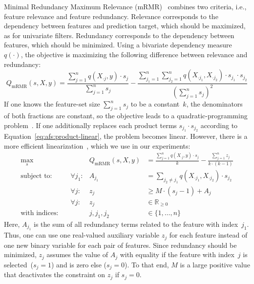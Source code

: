 \documentclass{article}
\theoremstyle{definition}
\begin{document}
Minimal Redundancy Maximum Relevance (mRMR)~\cite{peng2005feature} combines two criteria, i.e., feature relevance and feature redundancy.
Relevance corresponds to the dependency between features and prediction target, which should be maximized, as for univariate filters.
Redundancy corresponds to the dependency between features, which should be minimized.
Using a bivariate dependency measure~$q(\cdot)$, the objective is maximizing the following difference between relevance and redundancy:
%
\begin{equation}
	Q_{\text{mRMR}}(s,X,y) = \frac{\sum_{j=1}^{n} q(X_{\cdot{}j},y) \cdot s_j}{\sum_{j=1}^{n} s_j} - \frac{\sum_{j_1=1}^{n} \sum_{j_2=1}^{n} q(X_{\cdot{}j_1}, X_{\cdot{}j_2}) \cdot s_{j_1} \cdot s_{j_2}}{(\sum_{j=1}^{n} s_j)^2}
	\label{eq:afs:mrmr}
\end{equation}
%
If one knows the feature-set size $\sum_{j=1}^{n} s_j$ to be a constant~$k$, the denominators of both fractions are constant, so the objective leads to a quadratic-programming problem~\cite{nguyen2014effective, rodriguez2010quadratic}.
If one additionally replaces each product terms $s_{j_1} \cdot s_{j_2}$ according to Equation~\ref{eq:afs:product-linear}, the problem becomes linear.
However, there is a more efficient linearization~\cite{nguyen2009optimizing, nguyen2010towards}, which we use in our experiments:
%
\begin{equation}
	\begin{aligned}
		\max_s &\quad & Q_{\text{mRMR}}(s,X,y) &= \frac{\sum_{j=1}^{n} q(X_{\cdot{}j},y) \cdot s_j}{k} - \frac{\sum_{j=1}^{n} z_j}{k \cdot (k-1)} \\
		\text{subject to:} &\quad \forall j_1: & A_{j_1} &= \sum_{j_2 \neq j_1} q(X_{\cdot{}j_1}, X_{\cdot{}j_2}) \cdot s_{j_2} \\
		&\quad \forall j: & z_j &\geq M \cdot (s_j - 1) + A_j \\
		&\quad \forall j: & z_j &\in \mathbb{R}_{\geq 0} \\
		\text{with indices:} &\quad & j, j_1, j_2 &\in \{1, \dots, n\}
	\end{aligned}
	\label{eq:afs:mrmr-linear}
\end{equation}
%
Here, $A_{j_1}$ is the sum of all redundancy terms related to the feature with index~$j_1$.
Thus, one can use one real-valued auxiliary variable $z_j$ for each feature instead of one new binary variable for each pair of features.
Since redundancy should be minimized, $z_j$ assumes the value of $A_j$ with equality if the feature with index~$j$ is selected~($s_j=1$) and is zero else ($s_j=0$).
To that end, $M$ is a large positive value that deactivates the constraint on $z_j$ if $s_j=0$.
\end{document}
